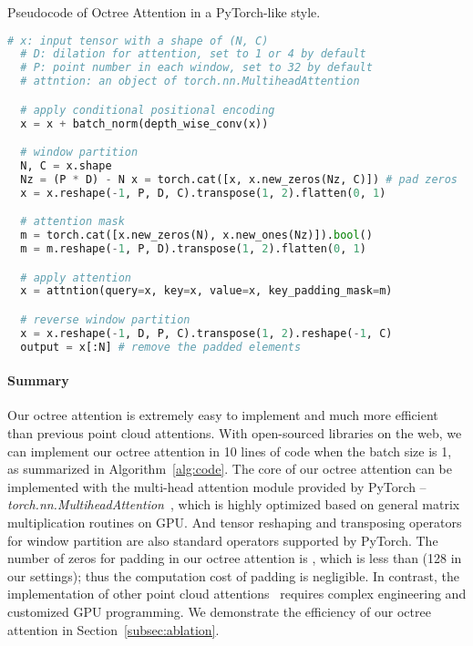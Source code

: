 \documentclass[acmtog,screen,authorversion]{acmart}
\begin{document}
\begin{algorithm}[t]
  \caption{\small Pseudocode of Octree Attention in a PyTorch-like style.}
  \label{alg:code}
  \begin{lstlisting}[language=python]
  # x: input tensor with a shape of (N, C)
  # D: dilation for attention, set to 1 or 4 by default
  # P: point number in each window, set to 32 by default
  # attntion: an object of torch.nn.MultiheadAttention

  # apply conditional positional encoding
  x = x + batch_norm(depth_wise_conv(x))

  # window partition
  N, C = x.shape
  Nz = (P * D) - N x = torch.cat([x, x.new_zeros(Nz, C)]) # pad zeros
  x = x.reshape(-1, P, D, C).transpose(1, 2).flatten(0, 1)

  # attention mask
  m = torch.cat([x.new_zeros(N), x.new_ones(Nz)]).bool()
  m = m.reshape(-1, P, D).transpose(1, 2).flatten(0, 1)

  # apply attention
  x = attntion(query=x, key=x, value=x, key_padding_mask=m)

  # reverse window partition
  x = x.reshape(-1, D, P, C).transpose(1, 2).reshape(-1, C)
  output = x[:N] # remove the padded elements
  \end{lstlisting}
\end{algorithm}


\paragraph{Summary}
Our octree attention is extremely easy to implement and much more efficient than previous point cloud attentions.
With open-sourced libraries on the web, we can implement our octree attention in 10 lines of code when the batch size is 1, as summarized in Algorithm~\ref{alg:code}.
The core of our octree attention can be implemented with the multi-head attention module provided by PyTorch -- \emph{torch.nn.MultiheadAttention}~\cite{Paszke2019}, which is highly optimized based on general matrix multiplication routines on GPU.
And tensor reshaping and transposing operators for window partition are also standard operators supported by PyTorch.
The number of zeros for padding in our octree attention is , which is less than  (128 in our settings); thus the computation cost of padding is negligible.
In contrast, the implementation of other point cloud attentions~\cite{Sun2022,Lai2022,Fan2022} requires complex engineering and customized GPU programming.
We demonstrate the efficiency of our octree attention in Section~\ref{subsec:ablation}.
\end{document}
